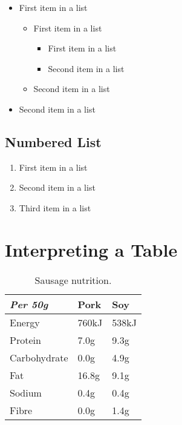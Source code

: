 \documentclass[11pt]{scrartcl} %
\begin{document}
\begin{itemize}
	\item First item in a list 
		\begin{itemize}
		\item First item in a list 
			\begin{itemize}
			\item First item in a list 
			\item Second item in a list 
			\end{itemize}
		\item Second item in a list 
		\end{itemize}
	\item Second item in a list 
\end{itemize}


\subsection{Numbered List}

\begin{enumerate}
	\item First item in a list 
	\item Second item in a list 
	\item Third item in a list
\end{enumerate}


\section{Interpreting a Table}

\begin{table}[h] %
	\centering %
	\begin{tabular}{l l l}
		\toprule
		\textit{Per 50g} & \textbf{Pork} & \textbf{Soy} \\
		\midrule
		Energy & 760kJ & 538kJ\\
		Protein & 7.0g & 9.3g\\
		Carbohydrate & 0.0g & 4.9g\\
		Fat & 16.8g & 9.1g\\
		Sodium & 0.4g & 0.4g\\
		Fibre & 0.0g & 1.4g\\
		\bottomrule
	\end{tabular}
	\caption{Sausage nutrition.}
\end{table}
\end{document}

